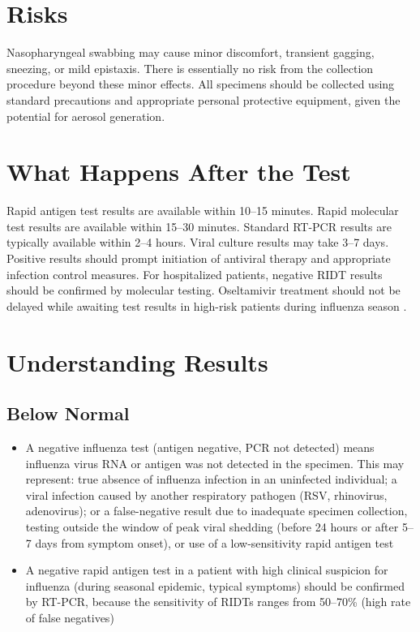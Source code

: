 \section*{Risks}
Nasopharyngeal swabbing may cause minor discomfort, transient gagging, sneezing, or mild epistaxis. There is essentially no risk from the collection procedure beyond these minor effects. All specimens should be collected using standard precautions and appropriate personal protective equipment, given the potential for aerosol generation.

\section*{What Happens After the Test}
Rapid antigen test results are available within 10--15 minutes. Rapid molecular test results are available within 15--30 minutes. Standard RT-PCR results are typically available within 2--4 hours. Viral culture results may take 3--7 days. Positive results should prompt initiation of antiviral therapy and appropriate infection control measures. For hospitalized patients, negative RIDT results should be confirmed by molecular testing. Oseltamivir treatment should not be delayed while awaiting test results in high-risk patients during influenza season \cite{ison2019therapeutic}.

\section*{Understanding Results}

\subsection*{Below Normal}
\begin{itemize}
  \item A negative influenza test (antigen negative, PCR not detected) means influenza virus RNA or antigen was not detected in the specimen. This may represent: true absence of influenza infection in an uninfected individual; a viral infection caused by another respiratory pathogen (RSV, rhinovirus, adenovirus); or a false-negative result due to inadequate specimen collection, testing outside the window of peak viral shedding (before 24 hours or after 5--7 days from symptom onset), or use of a low-sensitivity rapid antigen test
  \item A negative rapid antigen test in a patient with high clinical suspicion for influenza (during seasonal epidemic, typical symptoms) should be confirmed by RT-PCR, because the sensitivity of RIDTs ranges from 50--70\% (high rate of false negatives)
\end{itemize}

